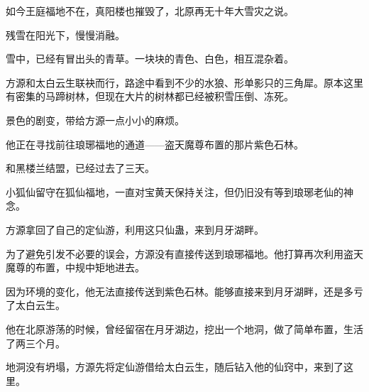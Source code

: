 \begin{this_body}
如今王庭福地不在，真阳楼也摧毁了，北原再无十年大雪灾之说。

残雪在阳光下，慢慢消融。

雪中，已经有冒出头的青草。一块块的青色、白色，相互混杂着。

方源和太白云生联袂而行，路途中看到不少的水狼、形单影只的三角犀。原本这里有密集的马蹄树林，但现在大片的树林都已经被积雪压倒、冻死。

景色的剧变，带给方源一点小小的麻烦。

他正在寻找前往琅琊福地的通道——盗天魔尊布置的那片紫色石林。

和黑楼兰结盟，已经过去了三天。

小狐仙留守在狐仙福地，一直对宝黄天保持关注，但仍旧没有等到琅琊老仙的神念。

方源拿回了自己的定仙游，利用这只仙蛊，来到月牙湖畔。

为了避免引发不必要的误会，方源没有直接传送到琅琊福地。他打算再次利用盗天魔尊的布置，中规中矩地进去。

因为环境的变化，他无法直接传送到紫色石林。能够直接来到月牙湖畔，还是多亏了太白云生。

他在北原游荡的时候，曾经留宿在月牙湖边，挖出一个地洞，做了简单布置，生活了两三个月。

地洞没有坍塌，方源先将定仙游借给太白云生，随后钻入他的仙窍中，来到了这里。

\end{this_body}

